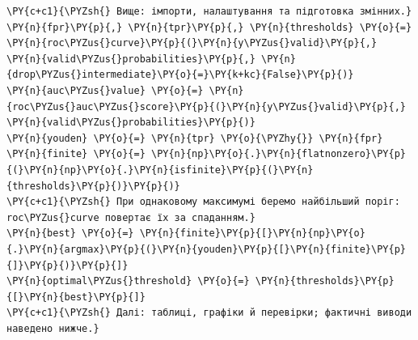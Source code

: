 \begin{Verbatim}[commandchars=\\\{\}]
\PY{c+c1}{\PYZsh{} Вище: імпорти, налаштування та підготовка змінних.}
\PY{n}{fpr}\PY{p}{,} \PY{n}{tpr}\PY{p}{,} \PY{n}{thresholds} \PY{o}{=} \PY{n}{roc\PYZus{}curve}\PY{p}{(}\PY{n}{y\PYZus{}valid}\PY{p}{,} \PY{n}{valid\PYZus{}probabilities}\PY{p}{,} \PY{n}{drop\PYZus{}intermediate}\PY{o}{=}\PY{k+kc}{False}\PY{p}{)}
\PY{n}{auc\PYZus{}value} \PY{o}{=} \PY{n}{roc\PYZus{}auc\PYZus{}score}\PY{p}{(}\PY{n}{y\PYZus{}valid}\PY{p}{,} \PY{n}{valid\PYZus{}probabilities}\PY{p}{)}
\PY{n}{youden} \PY{o}{=} \PY{n}{tpr} \PY{o}{\PYZhy{}} \PY{n}{fpr}
\PY{n}{finite} \PY{o}{=} \PY{n}{np}\PY{o}{.}\PY{n}{flatnonzero}\PY{p}{(}\PY{n}{np}\PY{o}{.}\PY{n}{isfinite}\PY{p}{(}\PY{n}{thresholds}\PY{p}{)}\PY{p}{)}
\PY{c+c1}{\PYZsh{} При однаковому максимумі беремо найбільший поріг: roc\PYZus{}curve повертає їх за спаданням.}
\PY{n}{best} \PY{o}{=} \PY{n}{finite}\PY{p}{[}\PY{n}{np}\PY{o}{.}\PY{n}{argmax}\PY{p}{(}\PY{n}{youden}\PY{p}{[}\PY{n}{finite}\PY{p}{]}\PY{p}{)}\PY{p}{]}
\PY{n}{optimal\PYZus{}threshold} \PY{o}{=} \PY{n}{thresholds}\PY{p}{[}\PY{n}{best}\PY{p}{]}
\PY{c+c1}{\PYZsh{} Далі: таблиці, графіки й перевірки; фактичні виводи наведено нижче.}
\end{Verbatim}
